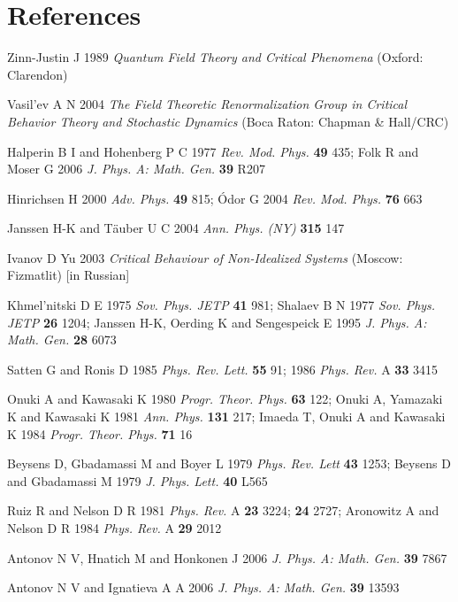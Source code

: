 \documentclass[12pt]{article}
\begin{document}
\section*{References}
\begin{thebibliography}{99}

 Zinn-Justin J 1989 {\it Quantum Field Theory and Critical
Phenomena} (Oxford: Clarendon)

 Vasil'ev A N 2004 {\it The Field Theoretic Renormalization
Group in Critical Behavior Theory and Stochastic Dynamics}
(Boca Raton: Chapman \& Hall/CRC)

 Halperin B I and Hohenberg P C 1977 {\it Rev. Mod. Phys.}
{\bf 49} 435; Folk R and Moser G 2006 {\it J. Phys. A: Math. Gen.}
{\bf 39} R207

 Hinrichsen H 2000 {\it Adv. Phys.} {\bf 49} 815;
 \'Odor G 2004 {\it Rev. Mod. Phys.} {\bf 76} 663

 Janssen H-K and T\"{a}uber U C 2004 {\it Ann. Phys. (NY)}
{\bf 315} 147

 Ivanov D Yu 2003 {\it Critical Behaviour of
Non-Idealized Systems} (Moscow: Fizmatlit) [in Russian]

 Khmel'nitski D E 1975 {\it Sov. Phys. JETP} {\bf 41} 981;
Shalaev B N 1977 {\it Sov. Phys. JETP} {\bf 26} 1204;
Janssen H-K, Oerding K and Sengespeick E 1995
{\it J. Phys. A: Math. Gen.} {\bf 28} 6073

 Satten G and Ronis D 1985 {\it Phys. Rev. Lett.}
{\bf 55} 91; 1986 {\it Phys. Rev.} A {\bf 33} 3415

 Onuki A and Kawasaki K 1980 {\it Progr. Theor. Phys.}
{\bf 63} 122;
Onuki A, Yamazaki K and Kawasaki K 1981 {\it Ann. Phys.} {\bf 131} 217;
Imaeda T, Onuki A and Kawasaki K 1984 {\it Progr. Theor. Phys.} {\bf 71} 16

 Beysens D, Gbadamassi M and Boyer L 1979
{\it Phys. Rev. Lett} {\bf 43} 1253;
Beysens D and Gbadamassi M 1979 {\it J. Phys. Lett.} {\bf 40} L565

 Ruiz R and Nelson D R 1981 {\it Phys. Rev.} A {\bf 23}
3224; {\bf 24} 2727;
Aronowitz A and Nelson D R 1984 {\it Phys. Rev.} A {\bf 29} 2012

 Antonov N V, Hnatich M and Honkonen J 2006
{\it J. Phys. A: Math. Gen.} {\bf 39} 7867

 Antonov N V and Ignatieva A A 2006
{\it J. Phys. A: Math. Gen.} {\bf 39} 13593


\end{thebibliography}
\end{document}

